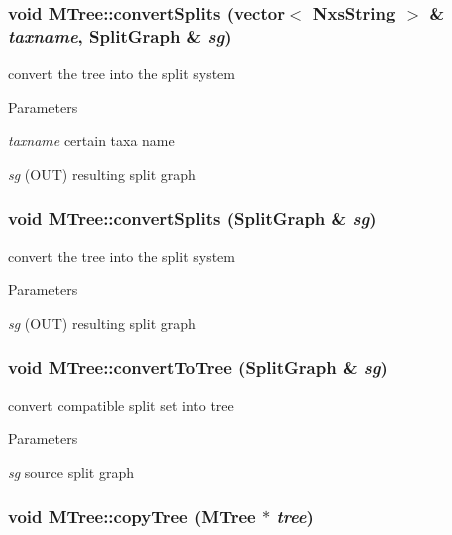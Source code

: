 \hypertarget{classMTree_a491979300fde5d4fac2f820c6ae327af}{
\subsubsection[{convertSplits}]{\setlength{\rightskip}{0pt plus 5cm}void MTree::convertSplits (vector$<$ {\bf NxsString} $>$ \& {\em taxname}, \/  {\bf SplitGraph} \& {\em sg})}}
\label{classMTree_a491979300fde5d4fac2f820c6ae327af}
convert the tree into the split system 
\begin{DoxyParams}{Parameters}
\item[{\em taxname}]certain taxa name \item[{\em sg}](OUT) resulting split graph \end{DoxyParams}
\hypertarget{classMTree_a95c626b2d8172ad06fabab353a77346e}{
\subsubsection[{convertSplits}]{\setlength{\rightskip}{0pt plus 5cm}void MTree::convertSplits ({\bf SplitGraph} \& {\em sg})}}
\label{classMTree_a95c626b2d8172ad06fabab353a77346e}
convert the tree into the split system 
\begin{DoxyParams}{Parameters}
\item[{\em sg}](OUT) resulting split graph \end{DoxyParams}
\hypertarget{classMTree_abd4b8cde5e2244eac599a42b33f21698}{
\subsubsection[{convertToTree}]{\setlength{\rightskip}{0pt plus 5cm}void MTree::convertToTree ({\bf SplitGraph} \& {\em sg})}}
\label{classMTree_abd4b8cde5e2244eac599a42b33f21698}
convert compatible split set into tree 
\begin{DoxyParams}{Parameters}
\item[{\em sg}]source split graph \end{DoxyParams}
\hypertarget{classMTree_ae1f6543f83abd7236065218131d7ea4b}{
\subsubsection[{copyTree}]{\setlength{\rightskip}{0pt plus 5cm}void MTree::copyTree ({\bf MTree} $\ast$ {\em tree})}}
